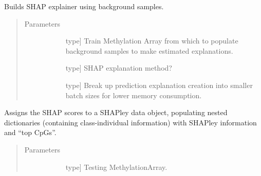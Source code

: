 \documentclass[letterpaper,10pt,english]{sphinxmanual}
\begin{document}
\begin{fulllineitems}
\begin{fulllineitems}
\label{\detokenize{index:methylnet.interpretation_classes.CpGExplainer.build_explainer}}
Builds SHAP explainer using background samples.
\begin{quote}\begin{description}
\item[{Parameters}] \leavevmode\begin{description}
\item[{}] \leavevmode{[}type{]}
Train Methylation Array from which to populate background samples to make estimated explanations.

\item[{}] \leavevmode{[}type{]}
SHAP explanation method?

\item[{}] \leavevmode{[}type{]}
Break up prediction explanation creation into smaller batch sizes for lower memory consumption.

\end{description}

\end{description}\end{quote}

\end{fulllineitems}


\begin{fulllineitems}
\label{\detokenize{index:methylnet.interpretation_classes.CpGExplainer.classifier_assign_scores_to_shap_data}}
Assigns the SHAP scores to a SHAPley data object, populating nested dictionaries (containing class-individual information) with SHAPley information and “top CpGs”.
\begin{quote}\begin{description}
\item[{Parameters}] \leavevmode\begin{description}
\item[{}] \leavevmode{[}type{]}
Testing MethylationArray.


\end{description}
\end{description}
\end{quote}
\end{fulllineitems}
\end{fulllineitems}
\end{document}
